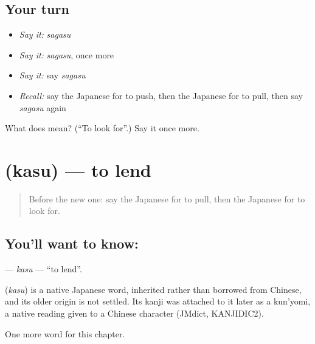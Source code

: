 \subsection*{Your turn}
\begin{itemize}
\raggedright
  \item \emph{Say it:} \emph{sagasu}
  \item \emph{Say it:} \emph{sagasu}, once more
  \item \emph{Say it:} say \emph{sagasu}
  \item \emph{Recall:} say the Japanese for to push, then the Japanese for to pull, then say \emph{sagasu} again
\end{itemize}

\begin{tcolorbox}[breakable,colback=teal!4,colframe=teal!35!black,title={Before you move on}]
What does  mean? (\textquotedblleft{}To look for\textquotedblright{}.) Say it once more.
\end{tcolorbox}
\section[\texorpdfstring{\ja{かす} (kasu)}{かす (kasu)}]{ (kasu) — to lend}

\label{lesson:JA-C30-kasu}



\begin{quote}
Before the new one: say the Japanese for to pull, then the Japanese for to look for.
\end{quote}

\subsection*{You'll want to know: }
\textbf{} — \emph{kasu} — \textquotedblleft{}to lend\textquotedblright{}.

\begin{cousinweb}
\textbf{} (\emph{kasu}) is a native Japanese word, inherited rather than borrowed from Chinese, and its older origin is not settled. Its kanji was attached to it later as a kun'yomi, a native reading given to a Chinese character (JMdict, KANJIDIC2).
\end{cousinweb}

\begin{grammarlens}[title={What you've built}]
One more word for this chapter.
\end{grammarlens}

